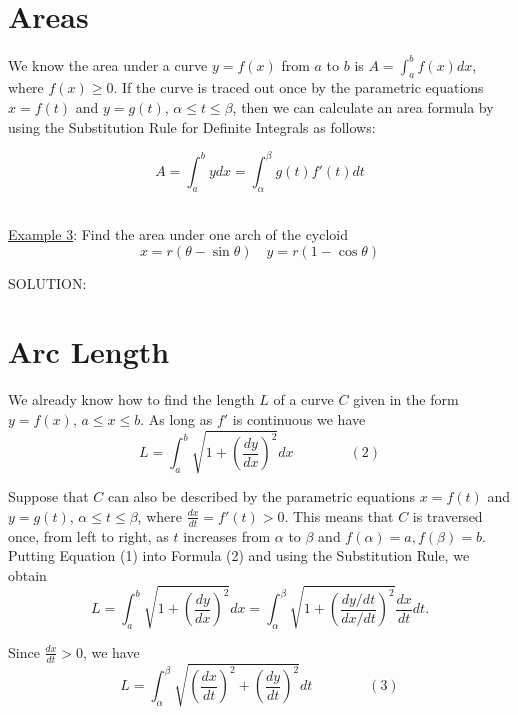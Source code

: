 \documentclass[paper=a4, fontsize=11pt]{scrartcl} %
\numberwithin{equation}{section} %
\numberwithin{figure}{section} %
\numberwithin{table}{section} %
\newcommand{\ds}{\displaystyle}
\begin{document}
 \section*{Areas}
 
 We know the area under a curve $y=f(x)$ from $a$ to $b$ is $A=\ds\int_a^b f(x)dx$, where $f(x)\geq 0$. If the curve is traced out once by the parametric equations $x=f(t)$ and $y=g(t)$, $\alpha \leq t \leq \beta$, then we can calculate an area formula by using the Substitution Rule for Definite Integrals as follows:
 
 \[\boxed{ \quad A = \ds\int_a^b y dx = \ds\int_\alpha^\beta g(t)f'(t)dt \quad }\]
 \indent\\
 \indent
 
 \underline{Example 3}: Find the area under one arch of the cycloid
 \[x=r(\theta - \sin\theta) \quad y=r(1-\cos\theta)\]
 
 SOLUTION:\\
 
 \vspace{3.5in}
 
 \newpage
 \section*{Arc Length}
 We already know how to find the length $L$ of a curve $C$ given in the form $y=f(x)$, $a\leq x\leq b$. As long as $f'$ is continuous we have\\
 
 \[L=\ds\int_a^b \ds\sqrt{1+\left(\ds\frac{dy}{dx}\right)^2}dx \quad \quad \quad \quad (2)\]
 \indent
 
 Suppose that $C$ can also be described by the parametric equations $x=f(t)$ and $y=g(t)$, $\alpha\leq t\leq \beta$, where $\ds\frac{dx}{dt}=f'(t)>0$. This means that $C$ is traversed once, from left to right, as $t$ increases from $\alpha$ to $\beta$ and $f(\alpha)=a, f(\beta)=b$. Putting Equation (1) into Formula (2) and using the Substitution Rule, we obtain\\
 
 \[L=\ds\int_a^b\ds\sqrt{1+\left(\ds\frac{dy}{dx}\right)^2}dx = \ds\int_\alpha^\beta\ds\sqrt{1+\left(\ds\frac{dy/dt}{dx/dt}\right)^2}\ds\frac{dx}{dt}dt.\]
 \indent
 
 Since $\ds\frac{dx}{dt}>0$, we have\\
 
 \[L = \ds\int_\alpha^\beta \ds\sqrt{\left(\ds\frac{dx}{dt}\right)^2 + \left(\ds\frac{dy}{dt}\right)^2}dt \quad \quad  \quad \quad (3)\]
 \indent
 
\end{document}
